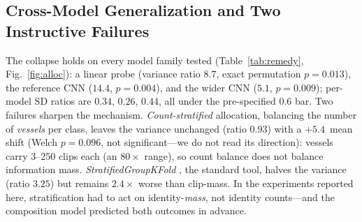 ﻿\documentclass[journal]{IEEEtran}
\newcommand{\pp}{\,\text{pp}}
\begin{document}
\subsection{Cross-Model Generalization and Two Instructive Failures}
The collapse holds on every model family tested (Table~\ref{tab:remedy}, Fig.~\ref{fig:alloc}): a
linear probe (variance
ratio $8.7$, exact permutation $p=0.013$), the reference CNN ($14.4$, $p=0.004$), and the wider CNN
($5.1$, $p=0.009$); per-model SD ratios are $0.34$, $0.26$, $0.44$, all under the pre-specified
$0.6$ bar. Two failures sharpen the mechanism. \emph{Count-stratified} allocation, balancing the
number of \emph{vessels} per class, leaves the variance unchanged (ratio $0.93$) with a $+5.4$\pp{}
mean shift (Welch $p=0.096$, not significant---we do not read its direction): vessels carry
3--250 clips each (an
$80\times$ range), so count balance does not balance information mass. \emph{StratifiedGroupKFold}
\cite{sklearn}, the standard tool, halves the variance (ratio $3.25$) but remains $2.4\times$ worse
than clip-mass. In the experiments reported here, stratification had to act on identity-\emph{mass},
not identity counts---and the
composition model predicted both outcomes in advance.
\end{document}
